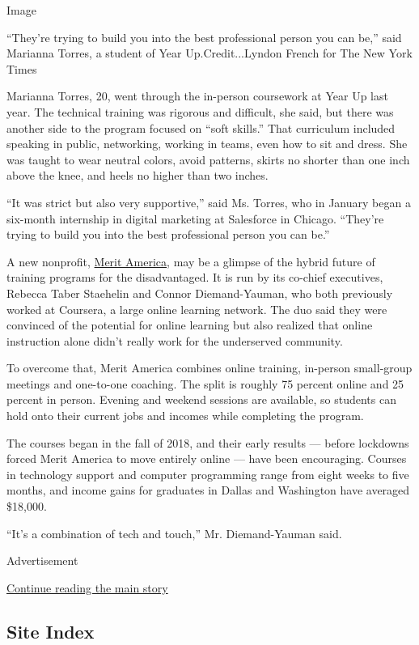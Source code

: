 Image

``They're trying to build you into the best professional person you can
be,'' said Marianna Torres, a student of Year Up.Credit...Lyndon French
for The New York Times

Marianna Torres, 20, went through the in-person coursework at Year Up
last year. The technical training was rigorous and difficult, she said,
but there was another side to the program focused on ``soft skills.''
That curriculum included speaking in public, networking, working in
teams, even how to sit and dress. She was taught to wear neutral colors,
avoid patterns, skirts no shorter than one inch above the knee, and
heels no higher than two inches.

``It was strict but also very supportive,'' said Ms. Torres, who in
January began a six-month internship in digital marketing at Salesforce
in Chicago. ``They're trying to build you into the best professional
person you can be.''

A new nonprofit, \href{https://www.meritamerica.org/}{Merit America},
may be a glimpse of the hybrid future of training programs for the
disadvantaged. It is run by its co-chief executives, Rebecca Taber
Staehelin and Connor Diemand-Yauman, who both previously worked at
Coursera, a large online learning network. The duo said they were
convinced of the potential for online learning but also realized that
online instruction alone didn't really work for the underserved
community.

To overcome that, Merit America combines online training, in-person
small-group meetings and one-to-one coaching. The split is roughly 75
percent online and 25 percent in person. Evening and weekend sessions
are available, so students can hold onto their current jobs and incomes
while completing the program.

The courses began in the fall of 2018, and their early results ---
before lockdowns forced Merit America to move entirely online --- have
been encouraging. Courses in technology support and computer programming
range from eight weeks to five months, and income gains for graduates in
Dallas and Washington have averaged \$18,000.

``It's a combination of tech and touch,'' Mr. Diemand-Yauman said.

Advertisement

\protect\hyperlink{after-bottom}{Continue reading the main story}

\hypertarget{site-index}{%
\subsection{Site Index}\label{site-index}}

